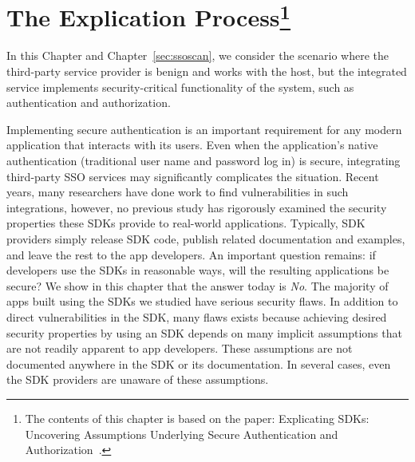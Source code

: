 \chapter[The Explication Process] {The Explication Process\footnote{The contents of this chapter is based on the paper: Explicating SDKs: Uncovering Assumptions Underlying Secure Authentication and Authorization~\cite{explicatingSDKs}.}}
\label{sec:explication}

In this Chapter and Chapter~\ref{sec:ssoscan}, we consider the scenario where the third-party service provider is benign and works with the host, but the integrated service implements security-critical functionality of the system, such as authentication and authorization. 

Implementing secure authentication is an important requirement for any modern application that interacts with its users.  Even when the application's native authentication (traditional user name and password log in) is secure, integrating third-party SSO services may significantly complicates the situation.  Recent years, many researchers have done work to find vulnerabilities in such integrations, however, no previous study has rigorously examined the security properties these SDKs provide to real-world applications.  Typically, SDK providers simply release SDK code, publish related documentation and examples, and leave the rest to the app developers.  An important question remains: if developers use the SDKs in reasonable ways, will the resulting applications be secure?  We show in this chapter that the answer today is \emph{No}.  The majority of apps built using the SDKs we studied have serious security flaws.  In addition to direct vulnerabilities in the SDK, many flaws exists because achieving desired security properties by using an SDK depends on many implicit assumptions that are not readily apparent to app developers. These assumptions are not documented anywhere in the SDK or its documentation. In several cases, even the SDK providers are unaware of these assumptions.

